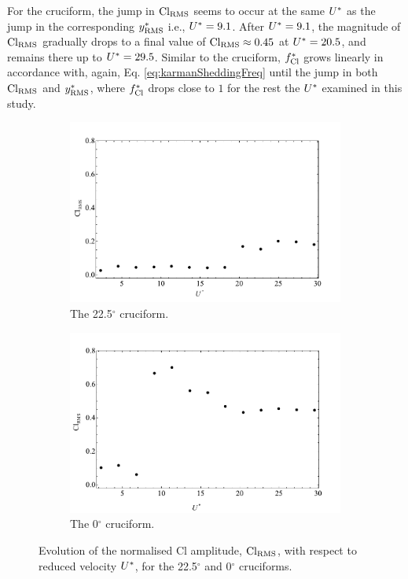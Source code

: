 \documentclass[oneside]{utmthesis}
\begin{document}
For the \angon{} cruciform, the jump in $\text{Cl}_{\text{RMS}}$ seems to occur at the same $U^{*}$ as the jump in the corresponding $y^{*}_{\text{RMS}}$ i.e., $U^{*} = 9.1$. After $U^{*} = 9.1$, the magnitude of $\text{Cl}_{\text{RMS}}$ gradually drops to a final value of $\text{Cl}_{\text{RMS}} \approx 0.45$ at $U^{*} = 20.5$, and remains there up to $U^{*} = 29.5$. Similar to the \angtw{} cruciform, $f_{\text{Cl}}^{*}$ grows linearly in accordance with, again, Eq. \ref{eq:karmanSheddingFreq} until the jump in both $\text{Cl}_{\text{RMS}}$ and $y^{*}_{\text{RMS}}$, where $f_{\text{Cl}}^{*}$ drops close to $1$ for the rest the $U^{*}$ examined in this study.

\begin{figure}
  \centering
  \begin{subfigure}[h]{1\textwidth}
    \includegraphics[width=\textwidth]{figs/clRMS2}
    \caption{The 22.5$^{\circ}$ cruciform.}
    \label{fig:clRMS2}
  \end{subfigure}
  
  \begin{subfigure}[h]{1\textwidth}
    \includegraphics[width=\textwidth]{figs/clRMS1}
    \caption{The 0$^{\circ}$ cruciform.}
    \label{fig:clRMS1}
  \end{subfigure}

  \label{fig:clRMS21}
  \caption{Evolution of the normalised Cl \rms{} amplitude, $\text{Cl}_{\text{RMS}}$, with respect to reduced velocity $U^{*}$, for the 22.5$^{\circ}$ and 0$^{\circ}$ cruciforms.}
\end{figure}
\end{document}
